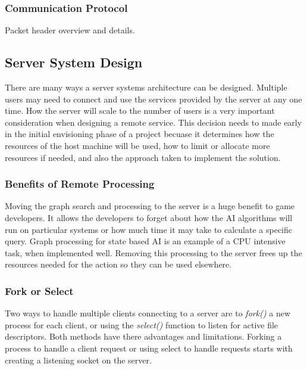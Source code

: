 \documentclass[12pt,a4paper,titlepage]{article}
\begin{document}
\subsubsection{Communication Protocol}

Packet header overview and details.\\

\subsection{Server System Design}
\label{section:serverdesign}

There are many ways a server systems architecture can be designed. Multiple users may need to connect and use the services provided by the server at any one time. How the server will scale to the number of users is a very important consideration when designing a remote service. This decision needs to made early in the initial envisioning phase of a project becuase it determines how the resources of the host machine will be used, how to limit or allocate more resources if needed, and also the approach taken to implement the solution.\\

\subsubsection{Benefits of Remote Processing}

Moving the graph search and processing to the server is a huge benefit to game developers. It allows the developers to forget about how the AI algorithms will run on particular systems or how much time it may take to calculate a specific query. Graph processing for state based AI is an example of a CPU intensive task, when implemented well. Removing this processing to the server frees up the resources needed for the action so they can be used elsewhere.\\


\subsubsection{Fork or Select}

Two ways to handle multiple clients connecting to a server are to \textit{fork()} a new process for each client, or using the \textit{select()} function to listen for active file descriptors. Both methods have there advantages and limitations. Forking a process to handle a client request or using select to handle requests starts with creating a listening socket on the server. 
\end{document}
